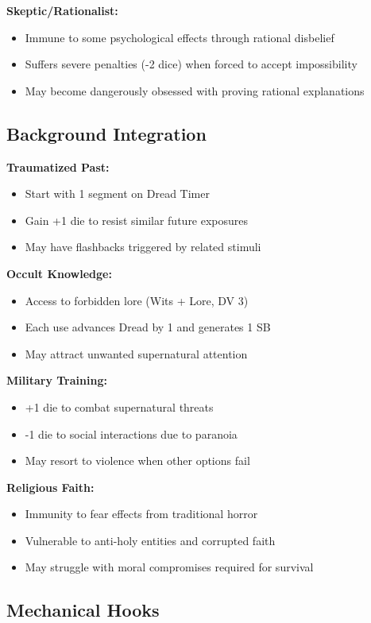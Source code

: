 \documentclass[11pt]{article}
\begin{document}
\textbf{Skeptic/Rationalist:}
\begin{itemize}
\item Immune to some psychological effects through rational disbelief
\item Suffers severe penalties (-2 dice) when forced to accept impossibility
\item May become dangerously obsessed with proving rational explanations
\end{itemize}

\subsection{Background Integration}

\textbf{Traumatized Past:}
\begin{itemize}
\item Start with 1 segment on Dread Timer 
\item Gain +1 die to resist similar future exposures
\item May have flashbacks triggered by related stimuli
\end{itemize}

\textbf{Occult Knowledge:}
\begin{itemize}
\item Access to forbidden lore (Wits + Lore, DV 3)
\item Each use advances Dread by 1 and generates 1 SB
\item May attract unwanted supernatural attention
\end{itemize}

\textbf{Military Training:}
\begin{itemize}
\item +1 die to combat supernatural threats
\item -1 die to social interactions due to paranoia
\item May resort to violence when other options fail
\end{itemize}

\textbf{Religious Faith:}
\begin{itemize}
\item Immunity to fear effects from traditional horror
\item Vulnerable to anti-holy entities and corrupted faith
\item May struggle with moral compromises required for survival
\end{itemize}

\subsection{Mechanical Hooks}
\end{document}
